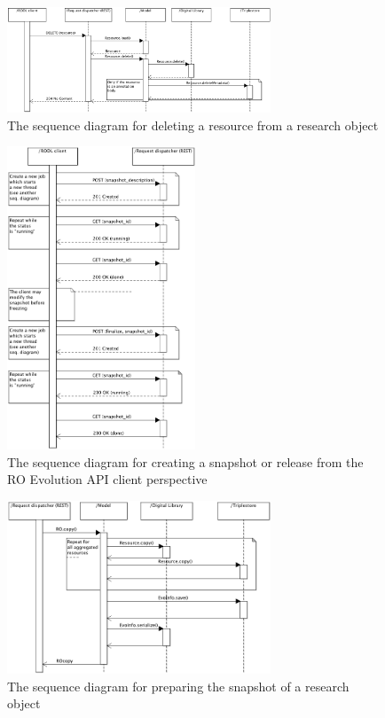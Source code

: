 \begin{figure}[!hb]
\centering
\includegraphics[width=0.7\textwidth]{Figures/RODL/ResourceDelete.png}
\caption{The sequence diagram for deleting a resource from a research object}
\label{ResourceDelete}
\end{figure}

\begin{figure}[!hb]
\centering
\includegraphics[width=0.5\textwidth]{Figures/RODL/SnapshotClient.png}
\caption{The sequence diagram for creating a snapshot or release from the RO Evolution API client perspective}
\label{SnapshotClient}
\end{figure}

\begin{figure}[!hb]
\centering
\includegraphics[width=0.7\textwidth]{Figures/RODL/SnapshotPerform.png}
\caption{The sequence diagram for preparing the snapshot of a research object}
\label{SnapshotPerform}
\end{figure}

